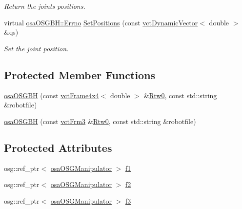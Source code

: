 \begin{DoxyCompactItemize}
\begin{DoxyCompactList}\small\item\em Return the joints positions. \end{DoxyCompactList}\item 
virtual \hyperlink{classrob_manipulator_a7bbb51cdb81c9c681075a9274ca0cdc0}{osa\-O\-S\-G\-B\-H\-::\-Errno} \hyperlink{classosa_o_s_g_b_h_a28a1caf6b03681ac71e0da5b2349f5b4}{Set\-Positions} (const \hyperlink{classvct_dynamic_vector}{vct\-Dynamic\-Vector}$<$ double $>$ \&qs)
\begin{DoxyCompactList}\small\item\em Set the joint position. \end{DoxyCompactList}\end{DoxyCompactItemize}
\subsection*{Protected Member Functions}
\begin{DoxyCompactItemize}
\item 
\hyperlink{classosa_o_s_g_b_h_afc21f71126c141e33c83dc2433f13522}{osa\-O\-S\-G\-B\-H} (const \hyperlink{classvct_frame4x4}{vct\-Frame4x4}$<$ double $>$ \&\hyperlink{classrob_manipulator_ab48d9d9a166bf252698bc35788ca6ad6}{Rtw0}, const std\-::string \&robotfile)
\item 
\hyperlink{classosa_o_s_g_b_h_ae201579cdcf5beb277718a6a5af439d3}{osa\-O\-S\-G\-B\-H} (const \hyperlink{vct_transformation_types_8h_a81feda0a02c2d1bc26e5553f409fed20}{vct\-Frm3} \&\hyperlink{classrob_manipulator_ab48d9d9a166bf252698bc35788ca6ad6}{Rtw0}, const std\-::string \&robotfile)
\end{DoxyCompactItemize}
\subsection*{Protected Attributes}
\begin{DoxyCompactItemize}
\item 
osg\-::ref\-\_\-ptr$<$ \hyperlink{classosa_o_s_g_manipulator}{osa\-O\-S\-G\-Manipulator} $>$ \hyperlink{classosa_o_s_g_b_h_a836e1fcb735edb2527ab520e5bf0f34f}{f1}
\item 
osg\-::ref\-\_\-ptr$<$ \hyperlink{classosa_o_s_g_manipulator}{osa\-O\-S\-G\-Manipulator} $>$ \hyperlink{classosa_o_s_g_b_h_a46d2249c302d3056e4758fe9ad2fd61c}{f2}
\item 
osg\-::ref\-\_\-ptr$<$ \hyperlink{classosa_o_s_g_manipulator}{osa\-O\-S\-G\-Manipulator} $>$ \hyperlink{classosa_o_s_g_b_h_a3f1f482d0c054f21e42116d809a9c1b4}{f3}
\end{DoxyCompactItemize}
